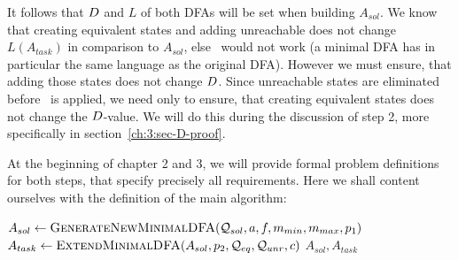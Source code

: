 It follows that $D$ and $L$ of both DFAs will be set when building $A_{sol}$. We know that creating equivalent states and adding unreachable does not change $L(A_{task})$ in comparison to $A_{sol}$, else \MinAlg\ would not work (a minimal DFA has in particular the same language as the original DFA). However we must ensure, that adding those states does not change $D$. Since unreachable states are eliminated before \CompDist\ is applied, we need only to ensure, that creating equivalent states does not change the $D$-value. We will do this during the discussion of step 2, more specifically in section~\ref{ch:3:sec-D-proof}.

At the beginning of chapter 2 and 3, we will provide formal problem definitions for both steps, that specify precisely all requirements. Here we shall content ourselves with the definition of the main algorithm:
\vspace{0.2cm}
\begin{algorithmic}[1]
	\State $A_{sol} \gets \textsc{GenerateNewMinimalDFA}(\mathcal{Q}_{sol}, a, f, m_{min}, m_{max}, p_1)$
	\State $A_{task} \gets \textsc{ExtendMinimalDFA}(A_{sol}, p_2, \mathcal{Q}_{eq},\mathcal{Q}_{unr}, c)$
	\State \Return $A_{sol}, A_{task}$
	\EndFunction
\end{algorithmic}


